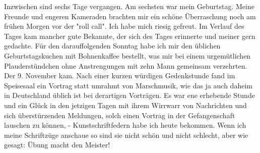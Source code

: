 \def\day{11. November 1942 *}
\mktitle

Inzwischen sind sechs Tage vergangen.
Am sechsten war mein Geburtstag.
Meine Freunde und engeren Kameraden brachten mir ein sch\"{o}ne \"{U}berraschung noch am fr\"{u}hen Morgen vor der "roll call".
Ich habe mich riesig gefreut.
Im Verlauf des Tages kam mancher gute Bekannte, der sich des Tages erinnerte und meiner gern gedachte.
F\"{u}r den darauffolgenden Sonntag habe ich mir den \"{u}blichen Geburtstagskuchen mit Bohnenkaffee bestellt, was mir bei einem urgem\"{u}tlichen Plauderst\"{u}ndchen ohne Anstrengungen mit zehn Mann gemeinsam verzehrten.
Der 9. November kam.
Nach einer kurzen w\"{u}rdigen Gedenkstunde fand im Speisesaal ein Vortrag statt umrahmt von Marschmusik, wie das ja auch daheim in Deutschland \"{u}blich ist bei derartigen Vortr\"{a}gen.
Es war ene erhebende Stunde und ein Gl\"{u}ck in den jetzigen Tagen mit ihrem Wirrwarr von Nachrichten und sich \"{u}berst\"{u}rzenden Meldungen, solch einen Vortrag in der Gefangenschaft lauschen zu k\"{o}nnen, - Kunstschriftfedern habe ich heute bekommen.
Wenn ich meine Schriftz\"{u}ge anschaue so sind sie nicht sch\"{o}n und nicht schlecht, aber wie gesagt: \"{U}bung macht den Meister!


\clearpage
